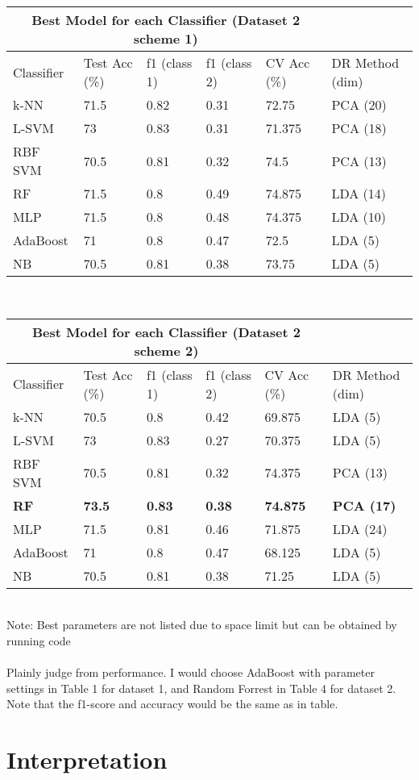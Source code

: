 \documentclass[11pt,a4paper]{article}
\begin{document}
 \label{tab:title} 
\begin{tabular}{llllll}
\hline
  \multicolumn{5}{c}{Best Model for each Classifier (Dataset 2 scheme 1)} \\
  \hline
Classifier  & Test Acc (\%) & f1 (class 1) & f1 (class 2) & CV Acc (\%)& DR Method (dim)\\
\hline
 k-NN		&71.5	&0.82	&0.31	&72.75	&PCA (20) \\
 L-SVM		&73		&0.83	&0.31	&71.375	&PCA (18) \\
 RBF SVM	&70.5	&0.81	&0.32	&74.5	&PCA (13) \\
 RF			&71.5	&0.8		&0.49	&74.875	&LDA (14) \\
 MLP			&71.5	&0.8		&0.48	&74.375	&LDA (10) \\
 AdaBoost		&71		&0.8		&0.47	&72.5	&LDA (5)\\
 NB			&70.5	&0.81	&0.38	&73.75	&LDA (5)\\
\end{tabular}
\\
 \label{tab:title} 
\begin{tabular}{llllll}
\hline
  \multicolumn{5}{c}{Best Model for each Classifier (Dataset 2 scheme 2)} \\
  \hline
Classifier  & Test Acc (\%) & f1 (class 1) & f1 (class 2) & CV Acc (\%)& DR Method (dim)\\
\hline
 k-NN		&70.5	&0.8		&0.42	&69.875	&LDA (5)\\
 L-SVM		&73		&0.83	&0.27	&70.375	&LDA (5)\\
 RBF SVM	&70.5	&0.81	&0.32	&74.375	&PCA (13)\\
 \textbf{RF}	&\textbf{73.5}	&\textbf{0.83}	&\textbf{0.38}	&\textbf{74.875}	&\textbf{PCA (17)}\\
 MLP			&71.5	&0.81	&0.46	&71.875	&LDA (24)\\
 AdaBoost		&71		&0.8		&0.47	&68.125	&LDA (5)\\
 NB			&70.5	&0.81	&0.38	&71.25	&LDA (5)\\
\end{tabular}
\\Note: Best parameters are not listed due to space limit but can be obtained by running code 
\\\\
Plainly judge from performance. I would choose AdaBoost with parameter settings in Table 1 for dataset 1, and Random Forrest in Table 4 for dataset 2. Note that the f1-score and accuracy would be the same as in table.
\section{Interpretation} 
\end{document}
